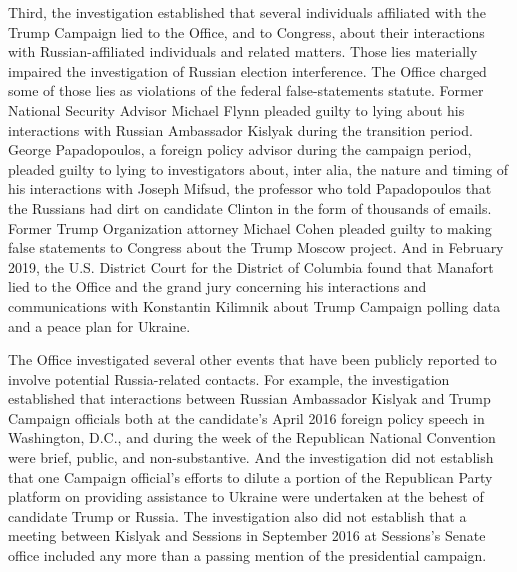 Third, the investigation established that several individuals affiliated with the Trump Campaign lied to the Office, and to Congress, about their interactions with Russian-affiliated individuals and related matters.
Those lies materially impaired the investigation of Russian election interference.
The Office charged some of those lies as violations of the federal false-statements statute.
Former National Security Advisor Michael Flynn pleaded guilty to lying about his interactions with Russian Ambassador Kislyak during the transition period.
George Papadopoulos, a foreign policy advisor during the campaign period, pleaded guilty to lying to investigators about, inter alia, the nature and timing of his interactions with Joseph Mifsud, the professor who told Papadopoulos that the Russians had dirt on candidate Clinton in the form of thousands of emails.
Former Trump Organization attorney Michael Cohen pleaded guilty to making false statements to Congress about the Trump Moscow project.
And in February 2019, the U.S. District Court for the District of Columbia found that Manafort lied to the Office and the grand jury concerning his interactions and communications with Konstantin Kilimnik about Trump Campaign polling data and a peace plan for Ukraine.

\hr

The Office investigated several other events that have been publicly reported to involve potential Russia-related contacts.
For example, the investigation established that interactions between Russian Ambassador Kislyak and Trump Campaign officials both at the candidate's April 2016 foreign policy speech in Washington, D.C., and during the week of the Republican National Convention were brief, public, and non-substantive.
And the investigation did not establish that one Campaign official's efforts to dilute a portion of the Republican Party platform on providing assistance to Ukraine were undertaken at the behest of candidate Trump or Russia.
The investigation also did not establish that a meeting between Kislyak and Sessions in September 2016 at Sessions's Senate office included any more than a passing mention of the presidential campaign.

